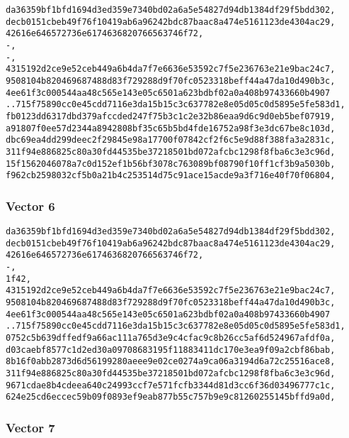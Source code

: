 \documentclass[
]{article}
\begin{document}
\begin{verbatim}
da36359bf1bfd1694d3ed359e7340bd02a6a5e54827d94db1384df29f5bdd302,
decb0151cbeb49f76f10419ab6a96242bdc87baac8a474e5161123de4304ac29,
42616e646572736e6174636820766563746f72,
-,
-,
4315192d2ce9e52ceb449a6b4da7f7e6636e53592c7f5e236763e21e9bac24c7,
9508104b820469687488d83f729288d9f70fc0523318beff44a47da10d490b3c,
4ee61f3c000544aa48c565e143e05c6501a623bdbf02a0a408b97433660b4907
..715f75890cc0e45cdd7116e3da15b15c3c637782e8e05d05c0d5895e5fe583d1,
fb0123dd6317dbd379afccded247f75b3c1c2e32b86eaa9d6c9d0eb5bef07919,
a91807f0ee57d2344a8942808bf35c65b5bd4fde16752a98f3e3dc67be8c103d,
dbc69ea4dd299deec2f29845e98a17700f07842cf2f6c5e9d88f388fa3a2831c,
311f94e886825c80a30fd44535be37218501bd072afcbc1298f8fba6c3e3c96d,
15f1562046078a7c0d152ef1b56bf3078c763089bf08790f10ff1cf3b9a5030b,
f962cb2598032cf5b0a21b4c253514d75c91ace15acde9a3f716e40f70f06804,
\end{verbatim}

\subsubsection{Vector 6}\label{vector-6-1}

\begin{verbatim}
da36359bf1bfd1694d3ed359e7340bd02a6a5e54827d94db1384df29f5bdd302,
decb0151cbeb49f76f10419ab6a96242bdc87baac8a474e5161123de4304ac29,
42616e646572736e6174636820766563746f72,
-,
1f42,
4315192d2ce9e52ceb449a6b4da7f7e6636e53592c7f5e236763e21e9bac24c7,
9508104b820469687488d83f729288d9f70fc0523318beff44a47da10d490b3c,
4ee61f3c000544aa48c565e143e05c6501a623bdbf02a0a408b97433660b4907
..715f75890cc0e45cdd7116e3da15b15c3c637782e8e05d05c0d5895e5fe583d1,
0752c5b639dffedf9a66ac111a765d3e9c4cfac9c8b26cc5af6d524967afdf0a,
d03caebf8577c1d2ed30a09708683195f11883411dc170e3ea9f09a2cbf86bab,
8b16f0abb2873d6d56199280aeee9e02ce0274a9ca06a3194d6a72c25516ace8,
311f94e886825c80a30fd44535be37218501bd072afcbc1298f8fba6c3e3c96d,
9671cdae8b4cdeea640c24993ccf7e571fcfb3344d81d3cc6f36d03496777c1c,
624e25cd6eccec59b09f0893ef9eab877b55c757b9e9c81260255145bffd9a0d,
\end{verbatim}

\subsubsection{Vector 7}\label{vector-7-1}
\end{document}

